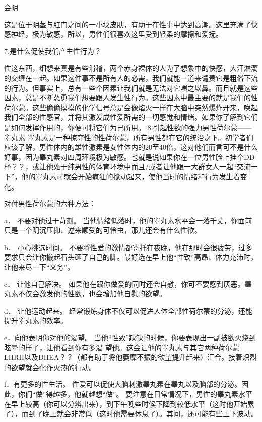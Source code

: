 \documentclass[12pt,UTF8,openany]{ctexbook}
\begin{document}
会阴

这是位于阴茎与肛门之间的一小块皮肤，有助于在性事中达到高潮。这里充满了快感神经，极为敏感，所以，男性们很喜欢这里受到轻柔的摩擦和爱抚。

7.是什么促使我们产生性行为？

性这东西，细想来真是有些滑稽，两个赤身裸体的人为了想象中的快感，大汗淋漓的交缠在一起。如果这件事不是所有人的必需，我们就能一道来谴责它是粗俗下流的行为。但事实上，总有一些个因素让我们就是无法对它嗤之以鼻。而且就是这些因素，总是不断怂恿我们想要跟人发生性行为。这些因素中最主要的就是我们的性荷尔蒙。这些偷偷摸摸的化学信号总是会像焰火一样在大脑中突然爆炸开来，唤起我们全部的性感官，并将其激发成性爱所需的一切感觉和情绪。如果你了解到它们是如何发挥作用的，你便可将它们为己所用。
8.引起性欲的强力男性荷尔蒙——睾丸素
睾丸素是一种掠夺性的性荷尔蒙，所有男性都在它的统治之下。初学者们应该了解，男性体内的雄性激素是女性体内的20至40倍，这对他们而言可不是什么好事，因为睾丸素对四周环境极为敏感。也就是说如果你在一位男性脸上挂个DD杯？？，或让他处于纯男性的体育环境中而且/或者让他跟一大群女人一起“交流一下”，他的睾丸素可就会开始疯狂的搅动起来，使他当时的情绪和行为发生着变化。

对付男性荷尔蒙的六种方法：

a． 不要对他过于苛刻。
当他情绪低落时，他的睾丸素水平会一落千丈，你面前只是一个阴沉压抑、逆来顺受的可怜虫，那儿还会有什么性欲。

b． 小心挑选时间。
不要将性爱的激情都寄托在夜晚，他在那时会很疲劳，过多要求只会让你搬起石头砸了自己的脚。最好选在早上他“性致”高昂、体力充沛时，让他来尽一下“义务”。

c． 让他自己解决。
如果他在跟你做爱的同时还会自慰，你可不要感到厌恶。睾丸素不仅会激发他的性欲，也会增加他自慰的欲望。

d． 让他运动起来。
经常锻炼身体不仅可以促进人体全部性荷尔蒙的分泌，还能提升睾丸素的效率。

e．向他表明你对他的渴望。
当他“性致”缺缺的时候，你要表现出一副被欲火烧到眩晕的样子，让他看到你有多渴 望他。这会让他的睾丸素与其它两种荷尔蒙LHRH以及DHEA？？（都有助于将他萎靡不振的欲望提升起来）汇合。接着炽烈的欲望就会化作火热的行动。

f．有更多的性生活。
性爱可以促使大脑刺激睾丸素在睾丸以及脑部的分泌。因此，你们“做”得越多，他就越想“做”。
要注意在日常情况下，男性的睾丸素水平在早上较高（你可以分辨出来），到下午晚些时候下降到较低水平（这时他开始累了），而到了晚上就会非常低（这时他需要休息了）。其间，还可能有些上下波动。
\end{document}
